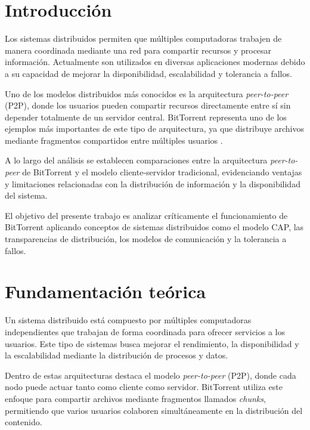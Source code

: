 \documentclass[12pt]{article}
\begin{document}
\newpage

\section{Introducción}

Los sistemas distribuidos permiten que múltiples computadoras trabajen de manera coordinada mediante una red para compartir recursos y procesar información. Actualmente son utilizados en diversas aplicaciones modernas debido a su capacidad de mejorar la disponibilidad, escalabilidad y tolerancia a fallos.

Uno de los modelos distribuidos más conocidos es la arquitectura \textit{peer-to-peer} (P2P), donde los usuarios pueden compartir recursos directamente entre sí sin depender totalmente de un servidor central. BitTorrent representa uno de los ejemplos más importantes de este tipo de arquitectura, ya que distribuye archivos mediante fragmentos compartidos entre múltiples usuarios \cite{ref1}.

A lo largo del análisis se establecen comparaciones entre la arquitectura \textit{peer-to-peer} de BitTorrent y el modelo cliente-servidor tradicional, evidenciando ventajas y limitaciones relacionadas con la distribución de información y la disponibilidad del sistema.

El objetivo del presente trabajo es analizar críticamente el funcionamiento de BitTorrent aplicando conceptos de sistemas distribuidos como el modelo CAP, las transparencias de distribución, los modelos de comunicación y la tolerancia a fallos.

\newpage

\section{Fundamentación teórica}

Un sistema distribuido está compuesto por múltiples computadoras independientes que trabajan de forma coordinada para ofrecer servicios a los usuarios. Este tipo de sistemas busca mejorar el rendimiento, la disponibilidad y la escalabilidad mediante la distribución de procesos y datos.

Dentro de estas arquitecturas destaca el modelo \textit{peer-to-peer} (P2P), donde cada nodo puede actuar tanto como cliente como servidor. BitTorrent utiliza este enfoque para compartir archivos mediante fragmentos llamados \textit{chunks}, permitiendo que varios usuarios colaboren simultáneamente en la distribución del contenido.
\end{document}
